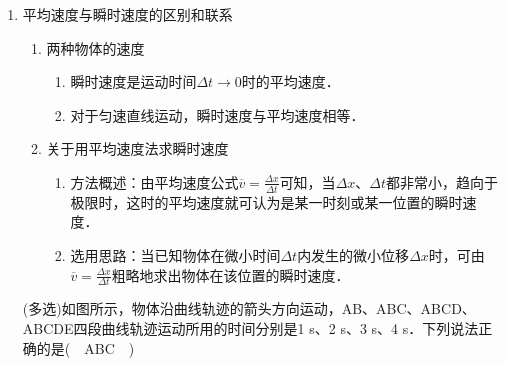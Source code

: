 \documentclass[cn,11pt]{elegantbook}
\begin{document}
\begin{enumerate}
         \begin{exercise}
            (2017·湖南株洲质检)(多选)关于位移和路程，下列说法正确的是(　BD　)
            A．物体在某一段时间内运动的位移为零，则其一定是静止的

            B．物体在某一段时间内运动的路程为零，则其一定是静止的

            C．在直线运动中，物体的位移大小一定等于其路程

            D．在曲线运动中，物体的位移大小一定小于路程
            \begin{solution}
               路程指物体运动轨迹的长度，而位移指由初位置指向末位置的有向线段，只有当物体做单向直线运动时，其位移大小才等于路程．容易判断选项B、D正确，A、C错误．

               
            \end{solution}

        
            
         \end{exercise}
         \item 平均速度与瞬时速度的区别和联系
         \begin{enumerate}
            \item 两种物体的速度
            \begin{enumerate}
               \item 瞬时速度是运动时间$\Delta t \rightarrow 0$时的平均速度．
               \item 对于匀速直线运动，瞬时速度与平均速度相等．

            \end{enumerate}
            \item 关于用平均速度法求瞬时速度
            \begin{enumerate}
               \item 方法概述：由平均速度公式$\overline{v}=\frac{\Delta x}{\Delta t}$可知，当$\Delta x、\Delta t$都非常小，趋向于极限时，这时的平均速度就可认为是某一时刻或某一位置的瞬时速度．
               \item 选用思路：当已知物体在微小时间$\Delta t$内发生的微小位移$\Delta x$时，可由$\overline{v}=\frac{\Delta x}{\Delta t}$粗略地求出物体在该位置的瞬时速度．
                  
            \end{enumerate}
         \end{enumerate}
         \begin{exercise}
            (多选)如图所示，物体沿曲线轨迹的箭头方向运动，AB、ABC、ABCD、ABCDE四段曲线轨迹运动所用的时间分别是1 s、2 s、3 s、4 s．下列说法正确的是(　ABC　)
            

\end{exercise}
\end{enumerate}
\end{document}
